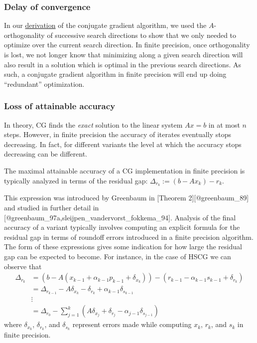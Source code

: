 \documentclass[10pt]{article}
\begin{document}
\subsubsection{Delay of convergence}

In our \href{./cg_derivation.html}{derivation} of the conjugate gradient algorithm, we used the \(A\)-orthogonality of successive search directions to show that we only needed to optimize over the current search direction.
In finite precision, once orthogonality is lost, we not longer know that minimizing along a given search direction will also result in a solution which is optimal in the previous search directions.
As such, a conjugate gradient algorithm in finite precision will end up doing ``redundant'' optimization.

\subsubsection{Loss of attainable accuracy}

In theory, CG finds the \emph{exact} solution to the linear system \(Ax=b\) in at most \(n\) steps.
However, in finite precision the accuracy of iterates eventually stops decreasing.
In fact, for different variants the level at which the accuracy stops decreasing can be different.

The maximal attainable accuracy of a CG implementation in finite precision is typically analyzed in terms of the residual gap: \(\Delta_{r_k} := (b - A x_k) - r_k\).

This expression was introduced by Greenbaum in {[}Theorem 2{]}{[}@greenbaum\_89{]} and studied in further detail in {[}@greenbaum\_97a,sleijpen\_vandervorst\_fokkema\_94{]}.
Analysis of the final accuracy of a variant typically involves computing an explicit formula for the residual gap in terms of roundoff errors introduced in a finite precision algorithm.
The form of these expressions gives some indication for how large the residual gap can be expected to become.
For instance, in the case of HSCG we can observe that
\begin{align*}
    \Delta_{r_k} 
    &= (b - A (x_{k-1} + \alpha_{k-1} p_{k-1} + \delta_{x_k} )) - (r_{k-1} - \alpha_{k-1} s_{k-1} + \delta_{r_k})
    \\&= \Delta_{r_{k-1}} - A \delta_{x_k} - \delta_{r_k} + \alpha_{k-1} \delta_{s_{k-1}}
    \\& \vdots
    \\&= \Delta_{r_0} - \sum_{j=1}^{k} \left( A \delta_{x_j} + \delta_{r_j} - \alpha_{j-1} \delta_{s_{j-1}} \right)
\end{align*}
where \(\delta_{x_k}\), \(\delta_{r_k}\), and \(\delta_{s_k}\) represent errors made while computing \(x_k\), \(r_k\), and \(s_k\) in finite precision.
\end{document}
